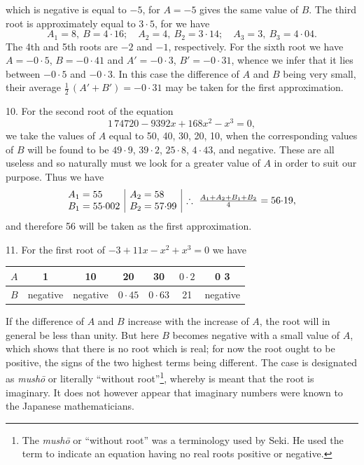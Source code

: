 \documentclass[11pt]{article}
\newcommand{\scanpage}[2]{\clearpage\setcounter{footnote}{0}\noindent{\footnotesize\color{gray}PDF page #1 · #2}\par\medskip}
\begin{document}
\scanpage{0279}{printed page 265}
\noindent which is negative is equal to $-5$, for $A = -5$ gives the same value of $B$. The third root is approximately equal to $3{\cdot}5$, for we have
\[
A_1 = 8,\ B = 4{\cdot}16;\quad A_2 = 4,\ B_2 = 3{\cdot}14;\quad A_3 = 3,\ B_3 = 4{\cdot}04.
\]
The 4th and 5th roots are $-2$ and $-1$, respectively. For the sixth root we have $A = -0{\cdot}5$, $B = -0{\cdot}41$ and $A' = -0{\cdot}3$, $B' = -0{\cdot}31$, whence we infer that it lies between $-0{\cdot}5$ and $-0{\cdot}3$. In this case the difference of $A$ and $B$ being very small, their average $\frac{1}{2}\,(A' + B') = -0{\cdot}31$ may be taken for the first approximation.

10. For the second root of the equation
\[
1\,74720 - 9392x + 168x^2 - x^3 = 0,
\]
we take the values of $A$ equal to 50, 40, 30, 20, 10, when the corresponding values of $B$ will be found to be $49{\cdot}9$, $39{\cdot}2$, $25{\cdot}8$, $4{\cdot}43$, and negative. These are all useless and so naturally must we look for a greater value of $A$ in order to suit our purpose. Thus we have
\[
\begin{array}{l|l|l}
\begin{array}{@{}l@{}} A_1 = 55\\ B_1 = 55{\cdot}002 \end{array} &
\begin{array}{@{}l@{}} A_2 = 58\\ B_2 = 57{\cdot}99 \end{array} &
\therefore\ \frac{A_1 + A_2 + B_1 + B_2}{4} = 56{\cdot}19,
\end{array}
\]
and therefore 56 will be taken as the first approximation.

11. For the first root of $-3 + 11x - x^2 + x^3 = 0$ we have
\begin{center}
\begin{tabular}{c|c|c|c|c|c|c}
$A$ & 1 & 10 & 20 & 30 & $0{\cdot}2$ & 0 3\\
\hline
$B$ & negative & negative & $0{\cdot}45$ & $0{\cdot}63$ & 21 & negative
\end{tabular}
\end{center}
\noindent If the difference of $A$ and $B$ increase with the increase of $A$, the root will in general be less than unity. But here $B$ becomes negative with a small value of $A$, which shows that there is no root which is real; for now the root ought to be positive, the signs of the two highest terms being different. The case is designated as \emph{mushō} or literally ``without root''\footnote{The \emph{mushō} or ``without root'' was a terminology used by Seki. He used the term to indicate an equation having no real roots positive or negative.}, whereby is meant that the root is imaginary. It does not however appear that imaginary numbers were known to the Japanese mathematicians.
\end{document}
